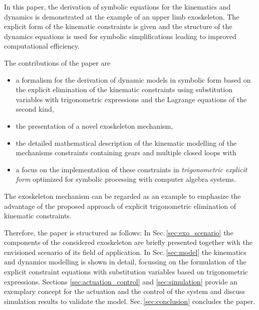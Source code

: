 \documentclass[twocolumn,10pt]{IFTOMM}
\begin{document}
In this paper, the derivation of symbolic equations for the kinematics and dynamics is demonstrated at the example of an upper limb exoskeleton.
The explicit form of the kinematic constraints is given and the structure of the dynamics equations is used for symbolic simplifications leading to improved computational efficiency.

%
%
%
%
%

The contributions of the paper are
\begin{itemize}
    \item a formalism for the derivation of dynamic models in symbolic form based on the explicit elimination of the kinematic constraints using substitution variables with trigonometric expressions and the Lagrange equations of the second kind,
    \item the presentation of a novel exoskeleton mechanism,
    \item the detailed mathematical description of the kinematic modelling of the mechanisms constraints containing gears and multiple closed loops with
    \item a focus on the implementation of these constraints in \emph{trigonometric explicit form} optimized for symbolic processing with computer algebra systems.
\end{itemize}

The exoskeleton mechanism can be regarded as an example to emphasize the advantage of the proposed approach of explicit trigonometric elimination of kinematic constraints.

Therefore, the paper is structured as follows:
In Sec.\,\ref{sec:exo_scenario} the components of the considered exoskeleton are briefly presented together with the envisioned scenario of its field of application. In Sec.\,\ref{sec:model} the kinematics and dynamics modelling is shown in detail, focussing on the formulation of the explicit constraint equations with substitution variables based on trigonometric expressions.
Sections \ref{sec:actuation_control} and
\ref{sec:simulation} provide an exemplary concept for the actuation and the control of the system and discuss simulation results to validate the model. Sec.\,\ref{sec:conclusion} concludes the paper.
\end{document}
